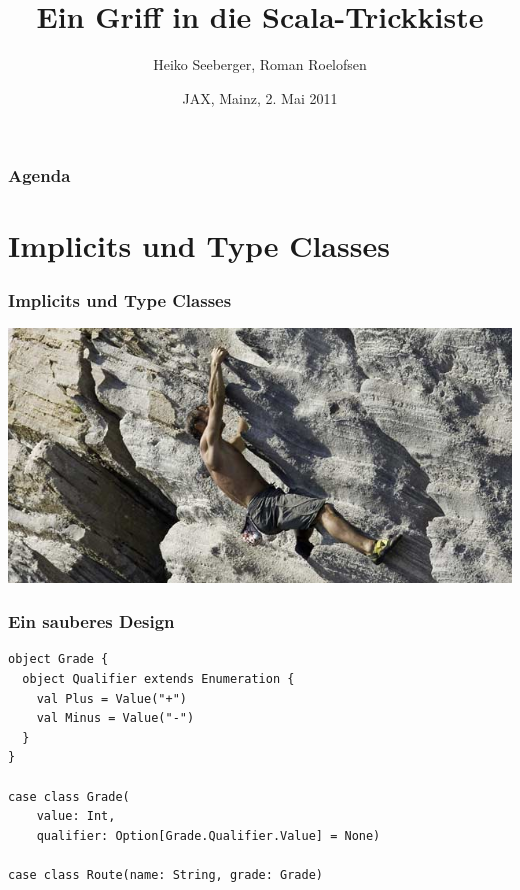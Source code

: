 \documentclass{beamer}
\title{Ein Griff in die Scala-Trickkiste}
\author{Heiko Seeberger, Roman Roelofsen}
\institute{WeigleWilczek}
\date{JAX, Mainz, 2. Mai 2011}
\begin{document}
\begin{frame}
  \titlepage
\end{frame}


\begin{frame}
  \frametitle{Agenda}
  \tableofcontents
\end{frame}


\section{Implicits und Type Classes}

\begin{frame}
  \frametitle{Implicits und Type Classes}
  \includegraphics[width=\linewidth]{img/free-climbing.jpg}
\end{frame}

\begin{frame}[fragile]
  \frametitle{Ein sauberes Design}
    \begin{lstlisting}
object Grade {
  object Qualifier extends Enumeration {
    val Plus = Value("+")
    val Minus = Value("-")
  }
}

case class Grade(
    value: Int, 
    qualifier: Option[Grade.Qualifier.Value] = None)

case class Route(name: String, grade: Grade)
    \end{lstlisting}
\end{frame}
\end{document}

